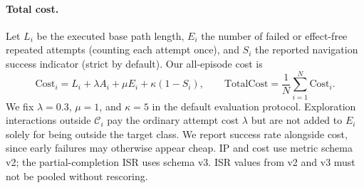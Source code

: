 \paragraph{Total cost.}
Let $L_i$ be the executed base path length, $E_i$ the number of failed or
effect-free repeated attempts (counting each attempt once), and $S_i$ the
reported navigation success indicator (strict by default). Our all-episode cost is
\begin{equation}
\mathrm{Cost}_i=L_i+\lambda A_i+\mu E_i+\kappa(1-S_i),
\qquad
\mathrm{TotalCost}=\frac{1}{N}\sum_{i=1}^{N}\mathrm{Cost}_i.
\end{equation}
We fix $\lambda=0.3$, $\mu=1$, and $\kappa=5$ in the default evaluation
protocol. Exploration interactions outside $\mathcal C_i$ pay the ordinary
attempt cost $\lambda$ but are not added to $E_i$ solely for being outside
the target class. We report success rate alongside cost, since early failures
may otherwise appear cheap. IP and cost use metric schema v2; the partial-completion ISR uses schema
v3. ISR values from v2 and v3 must not be pooled without rescoring.
